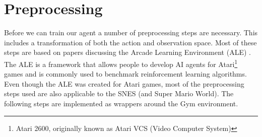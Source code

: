 \documentclass{article}
\begin{document}
\section{Preprocessing}
Before we can train our agent a number of preprocessing steps are necessary.
This includes a transformation of both the action and observation space.
Most of these steps are based on papers discussing the Arcade Learning Environment (ALE) \cite{bellemare2013arcade,machado2018revisiting}.
The ALE is a framework that allows people to develop AI agents for Atari\footnote{Atari 2600, originally known as Atari VCS (Video Computer System)} games and is commonly used to benchmark reinforcement learning algorithms.
Even though the ALE was created for Atari games, most of the preprocessing steps used are also applicable to the SNES (and Super Mario World).
The following steps are implemented as wrappers around the Gym environment.
\end{document}
